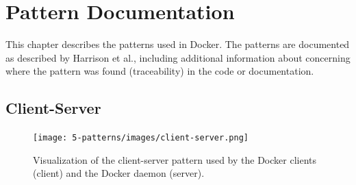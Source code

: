 
\clearpage
\chapter{Pattern Documentation}
\label{ch:patterns}
This chapter describes the patterns used in Docker. The patterns are documented as described by Harrison et al.\cite{usingpatternscapture}, including additional information about concerning where the pattern was found (traceability) in the code or documentation.

\section{Client-Server}
\begin{figure}[H]
\centering
\texttt{[image: 5-patterns/images/client-server.png]}
\caption{Visualization of the client-server pattern used by the Docker clients (client) and the Docker daemon (server).}
\label{fig:clientserver-pattern}
\end{figure}

